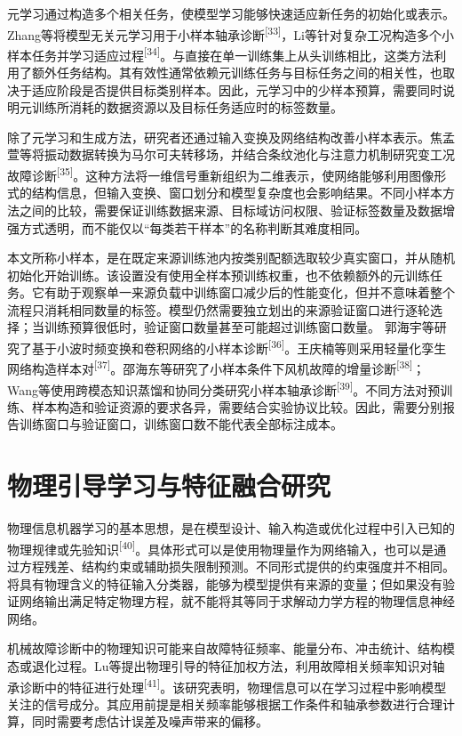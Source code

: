 \documentclass[UTF8,12pt,openany,twoside]{ctexbook}
\numberwithin{equation}{chapter}
\begin{document}
元学习通过构造多个相关任务，使模型学习能够快速适应新任务的初始化或表示。Zhang等将模型无关元学习用于小样本轴承诊断\textsuperscript{[33]}，Li等针对复杂工况构造多个小样本任务并学习适应过程\textsuperscript{[34]}。与直接在单一训练集上从头训练相比，这类方法利用了额外任务结构。其有效性通常依赖元训练任务与目标任务之间的相关性，也取决于适应阶段是否提供目标类别样本。因此，元学习中的少样本预算，需要同时说明元训练所消耗的数据资源以及目标任务适应时的标签数量。

除了元学习和生成方法，研究者还通过输入变换及网络结构改善小样本表示。焦孟萱等将振动数据转换为马尔可夫转移场，并结合条纹池化与注意力机制研究变工况故障诊断\textsuperscript{[35]}。这种方法将一维信号重新组织为二维表示，使网络能够利用图像形式的结构信息，但输入变换、窗口划分和模型复杂度也会影响结果。不同小样本方法之间的比较，需要保证训练数据来源、目标域访问权限、验证标签数量及数据增强方式透明，而不能仅以``每类若干样本''的名称判断其难度相同。

本文所称小样本，是在既定来源训练池内按类别配额选取较少真实窗口，并从随机初始化开始训练。该设置没有使用全样本预训练权重，也不依赖额外的元训练任务。它有助于观察单一来源负载中训练窗口减少后的性能变化，但并不意味着整个流程只消耗相同数量的标签。模型仍然需要独立划出的来源验证窗口进行逐轮选择；当训练预算很低时，验证窗口数量甚至可能超过训练窗口数量。 郭海宇等研究了基于小波时频变换和卷积网络的小样本诊断\textsuperscript{[36]}。王庆楠等则采用轻量化孪生网络构造样本对\textsuperscript{[37]}。邵海东等研究了小样本条件下风机故障的增量诊断\textsuperscript{[38]}；Wang等使用跨模态知识蒸馏和协同分类研究小样本轴承诊断\textsuperscript{[39]}。不同方法对预训练、样本构造和验证资源的要求各异，需要结合实验协议比较。因此，需要分别报告训练窗口与验证窗口，训练窗口数不能代表全部标注成本。

\section{物理引导学习与特征融合研究}\label{ux7269ux7406ux5f15ux5bfcux5b66ux4e60ux4e0eux7279ux5f81ux878dux5408ux7814ux7a76}

物理信息机器学习的基本思想，是在模型设计、输入构造或优化过程中引入已知的物理规律或先验知识\textsuperscript{[40]}。具体形式可以是使用物理量作为网络输入，也可以是通过方程残差、结构约束或辅助损失限制预测。不同形式提供的约束强度并不相同。将具有物理含义的特征输入分类器，能够为模型提供有来源的变量；但如果没有验证网络输出满足特定物理方程，就不能将其等同于求解动力学方程的物理信息神经网络。

机械故障诊断中的物理知识可能来自故障特征频率、能量分布、冲击统计、结构模态或退化过程。Lu等提出物理引导的特征加权方法，利用故障相关频率知识对轴承诊断中的特征进行处理\textsuperscript{[41]}。该研究表明，物理信息可以在学习过程中影响模型关注的信号成分。其应用前提是相关频率能够根据工作条件和轴承参数进行合理计算，同时需要考虑估计误差及噪声带来的偏移。
\end{document}
